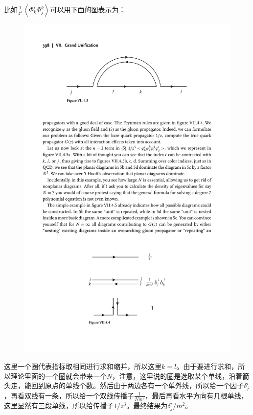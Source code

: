\begin{example}
	比如$\frac1{z^3}\left<\Phi^i_k\Phi^k_j\right>$可以用下面的图表示为：
	\begin{figure}[H]
		\centering
		\includegraphics{figs/fig7.pdf}
	\end{figure}
	这里一个圈代表指标取相同进行求和缩并，所以这里$k=l$。由于要进行求和，所以理论里面的一个圈就会带来一个$N$，注意，这里说的圈是选取某个单线，沿着箭头走，能回到原点的单线个数。然后由于两边各有一个单外线，所以给一个因子$\delta^i_j$，再看双线有一条，所以给一个双线传播子$\frac1{Nm^2}$，最后再看水平方向有几根单线，这里显然有三段单线，所以给传播子$1/z^3$。最终结果为$\delta^i_j/m^2$。
	

\end{example}
